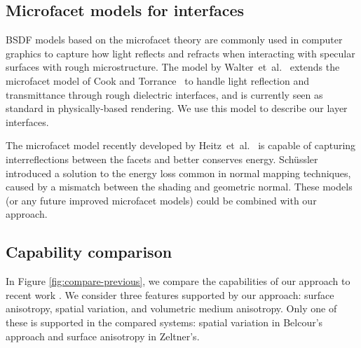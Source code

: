 \subsection{Microfacet models for interfaces}
BSDF models based on the microfacet theory are commonly used in computer graphics to capture how light reflects and refracts when interacting with specular surfaces with rough microstructure. The model by Walter~et~al.~ extends the microfacet model of Cook and Torrance~ to handle light reflection and transmittance through rough dielectric interfaces, and is currently seen as standard in physically-based rendering. We use this model to describe our layer interfaces.

The microfacet model recently developed by Heitz~et~al.~ is capable of capturing interreflections between the facets and better conserves energy. Sch\"ussler  introduced a solution to the energy loss common in normal mapping techniques, caused by a mismatch between the shading and geometric normal. These models (or any future improved microfacet models) could be combined with our approach.

\subsection{Capability comparison}
In Figure \ref{fig:compare-previous}, we compare the capabilities of our approach to recent work \cite{Zeltner2018,Belcour2018}. We consider three features supported by our approach: surface anisotropy, spatial variation, and volumetric medium anisotropy. Only one of these is supported in the compared systems: spatial variation in Belcour's approach and surface anisotropy in Zeltner's.


